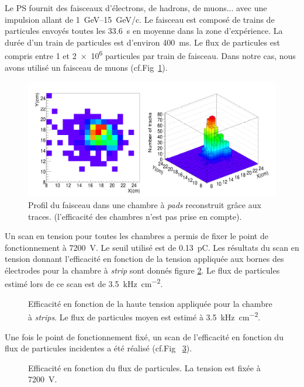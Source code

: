 Le PS fournit des faisceaux d'électrons, de hadrons, de muons... avec une impulsion allant de \SIrange{1}{15}{\giga\eV}/c. Le faisceau est composé de trains de particules envoyés toutes les \SI{33.6}{\second} en moyenne dans la zone d'expérience. La durée d'un train de particules est d'environ \SI{400}{\milli\second}. Le flux de particules est compris entre \num{1} et \num{2e6} particules par train de faisceau. Dans notre cas, nous avons utilisé un faisceau de muons (cf.Fig~\ref{faisceauPS}).
 
\begin{figure}[ht!]
	\centering
	\includegraphics[width=0.83\linewidth]{GLA/FaisceauPS.png}
	\caption{Profil du faisceau dans une chambre à \textit{pads} reconstruit grâce aux traces. (l'efficacité des chambres n'est pas prise en compte).}
	\label{faisceauPS}
\end{figure}

Un scan en tension pour toutes les chambres a permis de fixer le point de fonctionnement à \SI{7200}{\volt}. Le seuil utilisé est de \SI{0.13}{\pico\coulomb}. Les résultats du scan en tension donnant l'efficacité en fonction de la tension appliquée aux bornes des électrodes pour la chambre à \textit{strip} sont donnés figure \ref{ScanTensionPS}. Le flux de particules estimé lors de ce scan est de \SI{3.5}{\kilo\hertz\per\square\centi\meter}.

\begin{figure}[!ht]
	\centering
	\caption{Efficacité en fonction de la haute tension appliquée pour la chambre à \textit{strips}. Le flux de particules moyen est estimé à \SI{3.5}{\kilo\hertz\per\square\centi\meter}.}
	\label{ScanTensionPS}
\end{figure}

Une fois le point de fonctionnement fixé, un scan de l'efficacité en fonction du flux de particules incidentes a été réalisé (cf.Fig~ \ref{ScanRatePS}).

\begin{figure}[!ht]
	\centering
	\caption{Efficacité en fonction du flux de particules. La tension est fixée à \SI{7200}{\volt}.}
	\label{ScanRatePS}
\end{figure}


